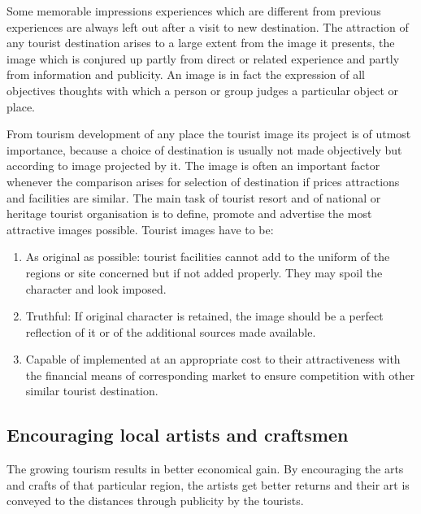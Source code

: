Some memorable impressions experiences which are different from previous experiences are always left out after a visit to new destination. The attraction of any tourist destination arises to a large extent from the image it presents, the image which is conjured up partly from direct or related experience and partly from information and publicity. An image is in fact the expression of all objectives thoughts with which a person or group judges a particular object or place.

From tourism development of any place the tourist image its project is of utmost importance, because a choice of destination is usually not made objectively but according to image projected by it. The image is often an important factor whenever the comparison arises for selection of destination if prices attractions and facilities are similar. The main task of tourist resort and of national or heritage tourist organisation is to define, promote and advertise the most attractive images possible. Tourist images have to be:

\begin{enumerate}
  \item As original as possible: tourist facilities cannot add to the uniform of the regions or site concerned but if not added properly. They may spoil the character and look imposed.
  \item Truthful: If original character is retained, the image should be a perfect reflection of it or of the additional sources made available.
  \item Capable of implemented at an appropriate cost to their attractiveness with the financial means of corresponding market to ensure competition with other similar tourist destination.
\end{enumerate} 


\subsection{Encouraging local artists and craftsmen} %
\label{sub:encor}

The growing tourism results in better economical gain. By encouraging the arts and crafts of that particular region, the artists get better returns and their art is conveyed to the distances through publicity by the tourists.



